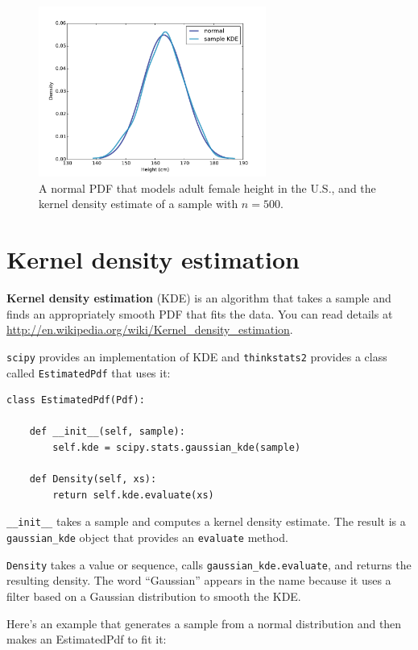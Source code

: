 \documentclass[12pt]{book}
\begin{document}
\begin{figure}
\centerline{\includegraphics[height=2.2in]{figs/pdf_example.pdf}}
\caption{A normal PDF that models adult female height in the U.S.,
and the kernel density estimate of a sample with $n=500$.}
\label{pdf_example}
\end{figure}


\section{Kernel density estimation} 

{\bf Kernel density estimation} (KDE) is an algorithm that takes
a sample and finds an appropriately smooth PDF that fits 
the data.  You can read details at
\url{http://en.wikipedia.org/wiki/Kernel_density_estimation}.

{\tt scipy} provides an implementation of KDE and {\tt thinkstats2}
provides a class called {\tt EstimatedPdf} that uses it:

\begin{verbatim}
class EstimatedPdf(Pdf):

    def __init__(self, sample):
        self.kde = scipy.stats.gaussian_kde(sample)

    def Density(self, xs):
        return self.kde.evaluate(xs)
\end{verbatim}

\verb"__init__" takes a sample
and computes a kernel density estimate.  The result is a
\verb"gaussian_kde" object that provides an {\tt evaluate}
method.

{\tt Density} takes a value or sequence, calls
\verb"gaussian_kde.evaluate", and returns the resulting density.  The
word ``Gaussian'' appears in the name because it uses a filter based
on a Gaussian distribution to smooth the KDE.  

Here's an example that generates a sample from a normal
distribution and then makes an EstimatedPdf to fit it:
\end{document}

